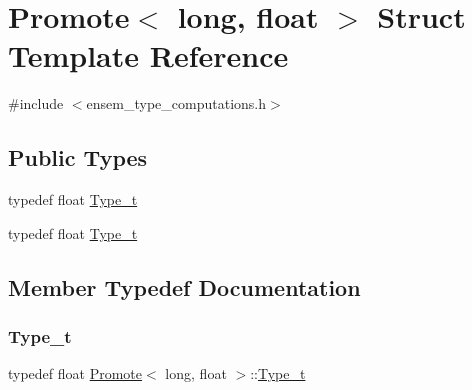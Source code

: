 \hypertarget{structPromote_3_01long_00_01float_01_4}{}\section{Promote$<$ long, float $>$ Struct Template Reference}
\label{structPromote_3_01long_00_01float_01_4}


{\ttfamily \#include $<$ensem\+\_\+type\+\_\+computations.\+h$>$}

\subsection*{Public Types}
\begin{DoxyCompactItemize}
\item 
typedef float \mbox{\hyperlink{structPromote_3_01long_00_01float_01_4_adf8f8e314d4cc953a8bec5fad1b5a495}{Type\+\_\+t}}
\item 
typedef float \mbox{\hyperlink{structPromote_3_01long_00_01float_01_4_adf8f8e314d4cc953a8bec5fad1b5a495}{Type\+\_\+t}}
\end{DoxyCompactItemize}


\subsection{Member Typedef Documentation}
\mbox{\label{structPromote_3_01long_00_01float_01_4_adf8f8e314d4cc953a8bec5fad1b5a495}} 
\subsubsection{\texorpdfstring{Type\_t}{Type\_t}\hspace{0.1cm}{\footnotesize\ttfamily [1/2]}}
{\footnotesize\ttfamily typedef float \mbox{\hyperlink{structPromote}{Promote}}$<$ long, float $>$\+::\mbox{\hyperlink{structPromote_3_01long_00_01float_01_4_adf8f8e314d4cc953a8bec5fad1b5a495}{Type\+\_\+t}}}

\mbox{\label{structPromote_3_01long_00_01float_01_4_adf8f8e314d4cc953a8bec5fad1b5a495}} 
